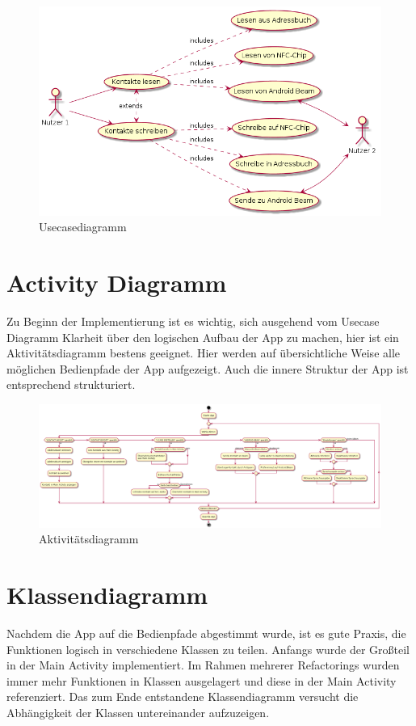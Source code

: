 \documentclass[a4paper,ngerman,12pt]{scrreprt}
\newcommand{\+}{\discretionary{\mbox{\scriptsize$\hookleftarrow$}}{}{}}
\begin{document}
\begin{figure}
\includegraphics[width=\textwidth]{general_usecase.png}
\caption{Usecasediagramm}
\end{figure}

\section{Activity Diagramm}

Zu Beginn der Implementierung ist es wichtig, sich ausgehend vom Usecase Diagramm Klarheit über den logischen Aufbau der App zu machen, hier ist ein Aktivitätsdiagramm bestens geeignet. Hier werden auf übersichtliche Weise alle möglichen Bedienpfade der App aufgezeigt. Auch die innere Struktur der App ist entsprechend strukturiert.

 
\begin{figure}
\includegraphics[width=\textwidth]{general_activity.png}
\caption{Aktivitätsdiagramm}
\end{figure}


\section{Klassendiagramm}

Nachdem die App auf die Bedienpfade abgestimmt wurde, ist es gute Praxis, die Funktionen logisch in verschiedene Klassen zu teilen. Anfangs wurde der Großteil in der Main Activity implementiert. Im Rahmen mehrerer Refactorings wurden immer mehr Funktionen in Klassen ausgelagert und diese in der Main Activity referenziert. Das zum Ende entstandene Klassendiagramm versucht die Abhängigkeit der Klassen untereinander aufzuzeigen.
\end{document}
